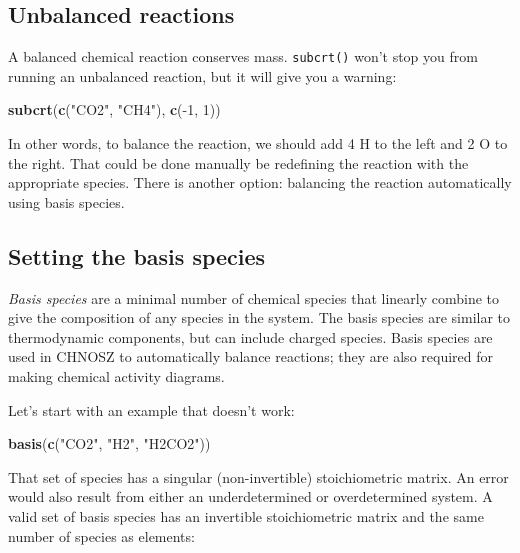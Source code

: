 \documentclass[]{tufte-handout}
\newenvironment{Shaded}{}{}
\newcommand{\KeywordTok}[1]{\textcolor[rgb]{0.00,0.44,0.13}{\textbf{#1}}}
\newcommand{\DecValTok}[1]{\textcolor[rgb]{0.25,0.63,0.44}{#1}}
\newcommand{\StringTok}[1]{\textcolor[rgb]{0.25,0.44,0.63}{#1}}
\newcommand{\OperatorTok}[1]{\textcolor[rgb]{0.40,0.40,0.40}{#1}}
\newcommand{\NormalTok}[1]{#1}
\begin{document}
\subsection{Unbalanced reactions}\label{unbalanced-reactions}

A balanced chemical reaction conserves mass. {\texttt{subcrt()}} won't
stop you from running an unbalanced reaction, but it will give you a
warning:

\begin{Shaded}
\begin{Highlighting}[]
\KeywordTok{subcrt}\NormalTok{(}\KeywordTok{c}\NormalTok{(}\StringTok{"CO2"}\NormalTok{, }\StringTok{"CH4"}\NormalTok{), }\KeywordTok{c}\NormalTok{(}\OperatorTok{-}\DecValTok{1}\NormalTok{, }\DecValTok{1}\NormalTok{))}
\end{Highlighting}
\end{Shaded}

In other words, to balance the reaction, we should add 4 H to the left
and 2 O to the right. That could be done manually be redefining the
reaction with the appropriate species. There is another option:
balancing the reaction automatically using basis species.

\subsection{Setting the basis species}\label{setting-the-basis-species}

\emph{Basis species} are a minimal number of chemical species that
linearly combine to give the composition of any species in the system.
The basis species are similar to thermodynamic components, but can
include charged species. Basis species are used in CHNOSZ to
automatically balance reactions; they are also required for making
chemical activity diagrams.

Let's start with an example that doesn't work:

\begin{Shaded}
\begin{Highlighting}[]
\KeywordTok{basis}\NormalTok{(}\KeywordTok{c}\NormalTok{(}\StringTok{"CO2"}\NormalTok{, }\StringTok{"H2"}\NormalTok{, }\StringTok{"H2CO2"}\NormalTok{))}
\end{Highlighting}
\end{Shaded}

That set of species has a singular (non-invertible) stoichiometric
matrix. An error would also result from either an underdetermined or
overdetermined system. A valid set of basis species has an invertible
stoichiometric matrix and the same number of species as elements:
\end{document}
